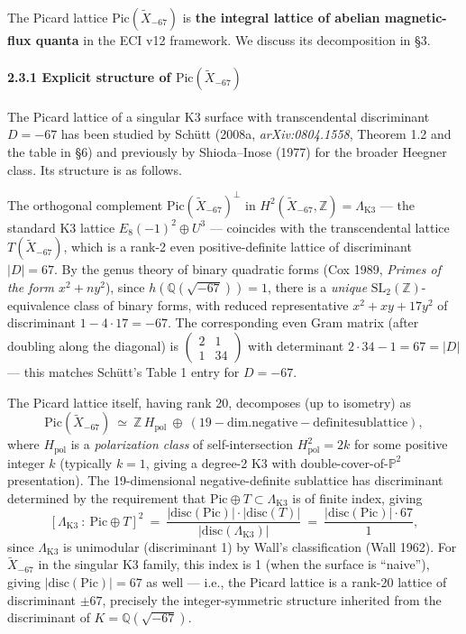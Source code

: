 \documentclass[
  11pt,
  a4paper,
]{article}
\begin{document}
The Picard lattice \(\mathrm{Pic}(\tilde X_{-67})\) is \textbf{the integral lattice of abelian magnetic-flux quanta} in the ECI v12 framework. We discuss its decomposition in §3.

\hypertarget{explicit-structure-of-mathrmpictilde-x_-67}{%
\paragraph{\texorpdfstring{2.3.1 Explicit structure of \(\mathrm{Pic}(\tilde X_{-67})\)}{2.3.1 Explicit structure of \textbackslash mathrm\{Pic\}(\textbackslash tilde X\_\{-67\})}}\label{explicit-structure-of-mathrmpictilde-x_-67}}

The Picard lattice of a singular K3 surface with transcendental discriminant \(D = -67\) has been studied by Schütt (2008a, \emph{arXiv:0804.1558}, Theorem 1.2 and the table in §6) and previously by Shioda--Inose (1977) for the broader Heegner class. Its structure is as follows.

The orthogonal complement \(\mathrm{Pic}(\tilde X_{-67})^\perp\) in \(H^2(\tilde X_{-67}, \mathbb Z) = \Lambda_{\mathrm{K3}}\) --- the standard K3 lattice \(E_8(-1)^2 \oplus U^3\) --- coincides with the transcendental lattice \(T(\tilde X_{-67})\), which is a rank-2 even positive-definite lattice of discriminant \(|D| = 67\). By the genus theory of binary quadratic forms (Cox 1989, \emph{Primes of the form \(x^2 + ny^2\)}), since \(h(\mathbb Q(\sqrt{-67})) = 1\), there is a \emph{unique} \(\mathrm{SL}_2(\mathbb Z)\)-equivalence class of binary forms, with reduced representative \(x^2 + xy + 17 y^2\) of discriminant \(1 - 4 \cdot 17 = -67\). The corresponding even Gram matrix (after doubling along the diagonal) is \(\begin{pmatrix} 2 & 1 \\ 1 & 34 \end{pmatrix}\) with determinant \(2\cdot 34 - 1 = 67 = |D|\) --- this matches Schütt's Table 1 entry for \(D = -67\).

The Picard lattice itself, having rank 20, decomposes (up to isometry) as
\[
\mathrm{Pic}(\tilde X_{-67})\ \simeq\ \mathbb Z\,H_{\mathrm{pol}}\ \oplus\ \mathrm{(19-dim. negative-definite sublattice)},
\]
where \(H_{\mathrm{pol}}\) is a \emph{polarization class} of self-intersection \(H_{\mathrm{pol}}^2 = 2k\) for some positive integer \(k\) (typically \(k = 1\), giving a degree-2 K3 with double-cover-of-\(\mathbb P^2\) presentation). The 19-dimensional negative-definite sublattice has discriminant determined by the requirement that \(\mathrm{Pic} \oplus T \subset \Lambda_{\mathrm{K3}}\) is of finite index, giving
\[
[\Lambda_{\mathrm{K3}}\ :\ \mathrm{Pic} \oplus T]^2\ =\ \frac{|\mathrm{disc}(\mathrm{Pic})|\cdot |\mathrm{disc}(T)|}{|\mathrm{disc}(\Lambda_{\mathrm{K3}})|}\ =\ \frac{|\mathrm{disc}(\mathrm{Pic})|\cdot 67}{1},
\]
since \(\Lambda_{\mathrm{K3}}\) is unimodular (discriminant 1) by Wall's classification (Wall 1962). For \(\tilde X_{-67}\) in the singular K3 family, this index is 1 (when the surface is ``naive''), giving \(|\mathrm{disc}(\mathrm{Pic})| = 67\) as well --- i.e., the Picard lattice is a rank-20 lattice of discriminant \(\pm 67\), precisely the integer-symmetric structure inherited from the discriminant of \(K = \mathbb Q(\sqrt{-67})\).
\end{document}
